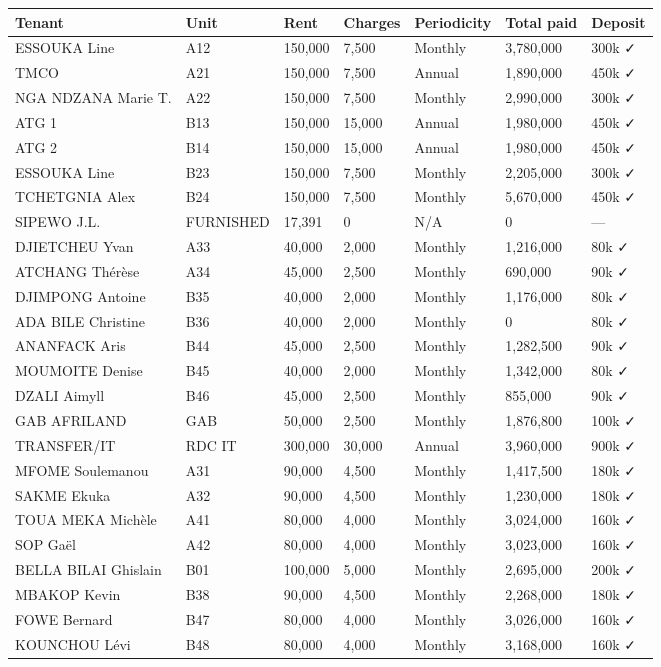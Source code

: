 \documentclass[a4paper,11pt]{article}
\begin{document}
\begin{longtable}{|p{3.5cm}|p{2.5cm}|p{1.5cm}|p{1.5cm}|p{2cm}|p{2cm}|p{2cm}|}
\hline
\textbf{Tenant} & \textbf{Unit} & \textbf{Rent} & \textbf{Charges} & \textbf{Periodicity} & \textbf{Total paid} & \textbf{Deposit} \\
\hline
\endhead
ESSOUKA Line & A12 & 150,000 & 7,500 & Monthly & 3,780,000 & 300k ✓ \\
\hline
TMCO & A21 & 150,000 & 7,500 & Annual & 1,890,000 & 450k ✓ \\
\hline
NGA NDZANA Marie T. & A22 & 150,000 & 7,500 & Monthly & 2,990,000 & 300k ✓ \\
\hline
ATG 1 & B13 & 150,000 & 15,000 & Annual & 1,980,000 & 450k ✓ \\
\hline
ATG 2 & B14 & 150,000 & 15,000 & Annual & 1,980,000 & 450k ✓ \\
\hline
ESSOUKA Line & B23 & 150,000 & 7,500 & Monthly & 2,205,000 & 300k ✓ \\
\hline
TCHETGNIA Alex & B24 & 150,000 & 7,500 & Monthly & 5,670,000 & 450k ✓ \\
\hline
SIPEWO J.L. & FURNISHED & 17,391 & 0 & N/A & 0 & — \\
\hline
DJIETCHEU Yvan & A33 & 40,000 & 2,000 & Monthly & 1,216,000 & 80k ✓ \\
\hline
ATCHANG Thérèse & A34 & 45,000 & 2,500 & Monthly & 690,000 & 90k ✓ \\
\hline
DJIMPONG Antoine & B35 & 40,000 & 2,000 & Monthly & 1,176,000 & 80k ✓ \\
\hline
ADA BILE Christine & B36 & 40,000 & 2,000 & Monthly & 0 & 80k ✓ \\
\hline
ANANFACK Aris & B44 & 45,000 & 2,500 & Monthly & 1,282,500 & 90k ✓ \\
\hline
MOUMOITE Denise & B45 & 40,000 & 2,000 & Monthly & 1,342,000 & 80k ✓ \\
\hline
DZALI Aimyll & B46 & 45,000 & 2,500 & Monthly & 855,000 & 90k ✓ \\
\hline
GAB AFRILAND & GAB & 50,000 & 2,500 & Monthly & 1,876,800 & 100k ✓ \\
\hline
TRANSFER/IT & RDC IT & 300,000 & 30,000 & Annual & 3,960,000 & 900k ✓ \\
\hline
MFOME Soulemanou & A31 & 90,000 & 4,500 & Monthly & 1,417,500 & 180k ✓ \\
\hline
SAKME Ekuka & A32 & 90,000 & 4,500 & Monthly & 1,230,000 & 180k ✓ \\
\hline
TOUA MEKA Michèle & A41 & 80,000 & 4,000 & Monthly & 3,024,000 & 160k ✓ \\
\hline
SOP Gaël & A42 & 80,000 & 4,000 & Monthly & 3,023,000 & 160k ✓ \\
\hline
BELLA BILAI Ghislain & B01 & 100,000 & 5,000 & Monthly & 2,695,000 & 200k ✓ \\
\hline
MBAKOP Kevin & B38 & 90,000 & 4,500 & Monthly & 2,268,000 & 180k ✓ \\
\hline
FOWE Bernard & B47 & 80,000 & 4,000 & Monthly & 3,026,000 & 160k ✓ \\
\hline
KOUNCHOU Lévi & B48 & 80,000 & 4,000 & Monthly & 3,168,000 & 160k ✓ \\
\hline
\end{longtable}
\end{document}
